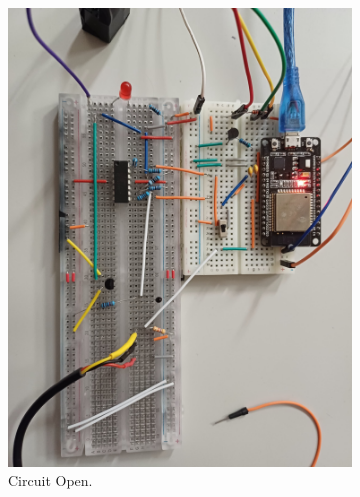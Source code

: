 \documentclass[12pt]{article}
\begin{document}
        \begin{figure}[H] 
            \centering
            \begin{subfigure}{0.45\textwidth}
                \includegraphics*[scale = 0.05]{images/RelayOff.jpeg}
                \caption{Circuit Open.}
                \label{fig:RelayOpen}
            \end{subfigure}
            \hfill
            \begin{subfigure}{0.45\textwidth}

\end{subfigure}
\end{figure}
\end{document}
